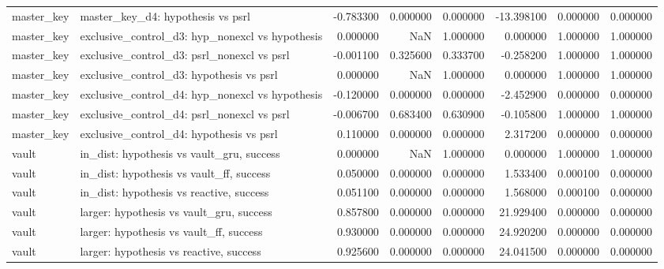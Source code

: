 \begin{tabular}{llrrrrrr}
master\_key & master\_key\_d4: hypothesis vs psrl & -0.783300 & 0.000000 & 0.000000 & -13.398100 & 0.000000 & 0.000000 \\
master\_key & exclusive\_control\_d3: hyp\_nonexcl vs hypothesis & 0.000000 & NaN & 1.000000 & 0.000000 & 1.000000 & 1.000000 \\
master\_key & exclusive\_control\_d3: psrl\_nonexcl vs psrl & -0.001100 & 0.325600 & 0.333700 & -0.258200 & 1.000000 & 1.000000 \\
master\_key & exclusive\_control\_d3: hypothesis vs psrl & 0.000000 & NaN & 1.000000 & 0.000000 & 1.000000 & 1.000000 \\
master\_key & exclusive\_control\_d4: hyp\_nonexcl vs hypothesis & -0.120000 & 0.000000 & 0.000000 & -2.452900 & 0.000000 & 0.000000 \\
master\_key & exclusive\_control\_d4: psrl\_nonexcl vs psrl & -0.006700 & 0.683400 & 0.630900 & -0.105800 & 1.000000 & 1.000000 \\
master\_key & exclusive\_control\_d4: hypothesis vs psrl & 0.110000 & 0.000000 & 0.000000 & 2.317200 & 0.000000 & 0.000000 \\
vault & in\_dist: hypothesis vs vault\_gru, success & 0.000000 & NaN & 1.000000 & 0.000000 & 1.000000 & 1.000000 \\
vault & in\_dist: hypothesis vs vault\_ff, success & 0.050000 & 0.000000 & 0.000000 & 1.533400 & 0.000100 & 0.000000 \\
vault & in\_dist: hypothesis vs reactive, success & 0.051100 & 0.000000 & 0.000000 & 1.568000 & 0.000100 & 0.000000 \\
vault & larger: hypothesis vs vault\_gru, success & 0.857800 & 0.000000 & 0.000000 & 21.929400 & 0.000000 & 0.000000 \\
vault & larger: hypothesis vs vault\_ff, success & 0.930000 & 0.000000 & 0.000000 & 24.920200 & 0.000000 & 0.000000 \\
vault & larger: hypothesis vs reactive, success & 0.925600 & 0.000000 & 0.000000 & 24.041500 & 0.000000 & 0.000000 \\
\bottomrule
\end{tabular}
